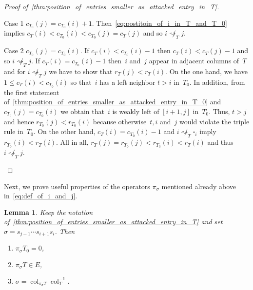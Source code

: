 \documentclass[10pt]{amsart}
\theoremstyle{plain}
\theoremstyle{plain}
\newtheorem{lemma}[lemma]{Lemma}
\theoremstyle{plain}
\theoremstyle{plain}
\theoremstyle{plain}
\theoremstyle{definition}
\theoremstyle{definition}
\newenvironment{enonce*}[2][]{\par\smallskip\noindent\textbf{#2}.\par\nobreak}{\par\smallskip}
\newcommand{\fs}{s}
\newcommand{\col}{\operatorname{col}}
\newcommand{\att}{\rightsquigarrow}
\newcommand{\natt}{\not \rightsquigarrow}
\newcommand{\cell}{\square}
\begin{document}
\begin{proof}[Proof of~\cref{thm:position_of_entries_smaller_as_attacked_entry_in_T}]
\begin{enonce*}[remark]{Case 1} $c_{T_0}(j)=c_{T_0}(i)+1$. Then~\eqref{eq:postitoin_of_i_in_T_and_T_0} implies $c_T(i) < c_{T_0}(i)< c_{T_0}(j) = c_T(j)$ and so $i\not \att_T j$. 
\end{enonce*}

\begin{enonce*}[remark]{Case 2} $c_{T_0}(j)=c_{T_0}(i)$. If $c_T(i) < c_{T_0}(i)-1$ then $c_T(i) < c_T(j)-1$ and so $i\natt_T j$. If $c_T(i) = c_{T_0}(i)-1$ then~$i$ and~$j$ appear in adjacent columns of~$T$ and for $i\natt_T j$ we have to show that $r_T(j) < r_T(i)$.
	 On the one hand, we have $1\leq c_T(i) <c_{T_0}(i)$ so that~$i$ has a left neighbor $t>i$ in~$T_0$.
	 In addition, from the first statement of~\cref{thm:position_of_entries_smaller_as_attacked_entry_in_T_0} and $c_{T_0}(j)=c_{T_0}(i)$ we obtain that~$i$ is weakly left of $[i+1,j]$ in~$T_0$.
	 Thus, $t>j$ and hence $r_{T_0}(j) < r_{T_0}(i)$ because otherwise~$t,i$ and~$j$ would violate the triple rule in~$T_0$.
	 On the other hand, $c_T(i) = c_{T_0}(i)-1$ and $i\not \att_T \cell_i$ imply $r_{T_0}(i) < r_T(i)$. All in all, $r_{T}(j) = r_{T_0}(j) < r_{T_0}(i) < r_T(i)$ and thus $i \not \att_T j$.\qedhere
\end{enonce*}
\end{proof}

Next, we prove useful properties of the operators $\pi_\sigma$ mentioned already above in~\eqref{eq:def_of_i_and_j}.

\begin{lemma}
	\label{thm:end:annihilator_for_T_0}
	Keep the notation of~\cref{thm:position_of_entries_smaller_as_attacked_entry_in_T} and set $\sigma = \fs_{j-1} \cdots \fs_{i+1} \fs_i$. Then
	\begin{enumerate}
		\item\label{lemma4.9_1} $\pi_\sigma T_0 = 0$,
		\item\label{lemma4.9_2} $\pi_\sigma T \in E$,
		\item\label{lemma4.9_3} $\sigma = \col_{\pi_\sigma T} \col^{-1}_{T}$.
	\end{enumerate}
\end{lemma}
\end{document}
